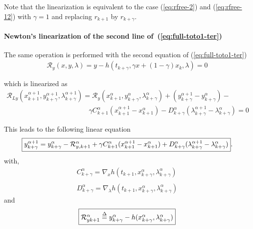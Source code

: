 Note that the linearization is equivalent to the case (\ref{eq:rfree-2}) and (\ref{eq:rfree-12}) with $\gamma=1$ and replacing $r_{k+1}$ by $r_{k+\gamma}$.

 \paragraph{Newton's linearization of the second  line of~(\ref{eq:full-toto1-ter})}
The same operation is performed with the second equation of (\ref{eq:full-toto1-ter})
\begin{equation}
  \begin{array}{l}
    \mathcal R_y(x,y,\lambda)=y-h(t_{k+\gamma},\gamma x + (1-\gamma) x_k ,\lambda) =0\\ \\
  \end{array}
\end{equation}
which is linearized as
\begin{equation}
  \label{eq:full-NL9}
  \begin{array}{l}
    \mathcal R_{Ly}(x^{\alpha+1}_{k+1},y^{\alpha+1}_{k+\gamma},\lambda^{\alpha+1}_{k+\gamma}) = \mathcal
    R_{y}(x^{\alpha}_{k+1},y^{\alpha}_{k+\gamma},\lambda^{\alpha}_{k+\gamma}) +
    (y^{\alpha+1}_{k+\gamma}-y^{\alpha}_{k+\gamma})- \\[2mm] \qquad  \qquad \qquad \qquad  \qquad \qquad
    \gamma C^{\alpha}_{k+1}(x^{\alpha+1}_{k+1}-x^{\alpha}_{k+1}) - D^{\alpha}_{k+\gamma}(\lambda^{\alpha+1}_{k+\gamma}-\lambda^{\alpha}_{k+\gamma})=0
  \end{array}
\end{equation}

This leads to the following linear equation
\begin{equation}
  \boxed{y^{\alpha+1}_{k+\gamma} =  y^{\alpha}_{k+\gamma}
  -\mathcal R^{\alpha}_{y,k+1}+ \\
  \gamma C^{\alpha}_{k+1}(x^{\alpha+1}_{k+1}-x^{\alpha}_{k+1}) +
  D^{\alpha}_{k+\gamma}(\lambda^{\alpha+1}_{k+\gamma}-\lambda^{\alpha}_{k+\gamma})}. \label{eq:full-NL11y}
\end{equation}
with,
\begin{equation}
     \begin{array}{l}
  C^{\alpha}_{k+\gamma} = \nabla_xh(t_{k+1}, x^{\alpha}_{k+\gamma},\lambda^{\alpha}_{k+\gamma} ) \\ \\
  D^{\alpha}_{k+\gamma} = \nabla_{\lambda}h(t_{k+1}, x^{\alpha}_{k+\gamma},\lambda^{\alpha}_{k+\gamma})
 \end{array}
\end{equation}
and
\begin{equation}\fbox{$
\mathcal R^{\alpha}_{yk+1} \stackrel{\Delta}{=} y^{\alpha}_{k+\gamma} - h(x^{\alpha}_{k+\gamma},\lambda^{\alpha}_{k+\gamma})$}
 \end{equation}


